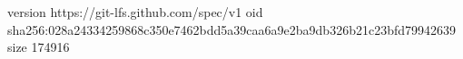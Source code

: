 version https://git-lfs.github.com/spec/v1
oid sha256:028a24334259868c350e7462bdd5a39caa6a9e2ba9db326b21c23bfd79942639
size 174916
